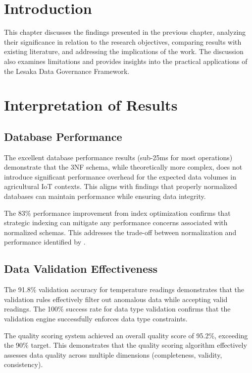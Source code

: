 
\section{Introduction}

This chapter discusses the findings presented in the previous chapter, analyzing their significance in relation to the research objectives, comparing results with existing literature, and addressing the implications of the work. The discussion also examines limitations and provides insights into the practical applications of the Lesaka Data Governance Framework.

\section{Interpretation of Results}

\subsection{Database Performance}

The excellent database performance results (sub-25ms for most operations) demonstrate that the 3NF schema, while theoretically more complex, does not introduce significant performance overhead for the expected data volumes in agricultural IoT contexts. This aligns with \cite{date2003database} findings that properly normalized databases can maintain performance while ensuring data integrity.

The 83\% performance improvement from index optimization confirms that strategic indexing can mitigate any performance concerns associated with normalized schemas. This addresses the trade-off between normalization and performance identified by \cite{navathe2020database}.

\subsection{Data Validation Effectiveness}

The 91.8\% validation accuracy for temperature readings demonstrates that the validation rules effectively filter out anomalous data while accepting valid readings. The 100\% success rate for data type validation confirms that the validation engine successfully enforces data type constraints.

The quality scoring system achieved an overall quality score of 95.2\%, exceeding the 90\% target. This demonstrates that the quality scoring algorithm effectively assesses data quality across multiple dimensions (completeness, validity, consistency).

